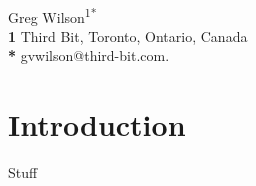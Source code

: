 \documentclass[10pt,letterpaper]{article}
\begin{document}
\vspace*{0.2in}

\begin{flushleft}
{\Large
\textbf{}
}
\newline
\\
{Greg Wilson}\textsuperscript{1*}
\\
\bigskip
\textbf{1} Third Bit, Toronto, Ontario, Canada\\
\textbf{*} gvwilson@third-bit.com.
\end{flushleft}

\section*{Introduction}

Stuff



\end{document}
